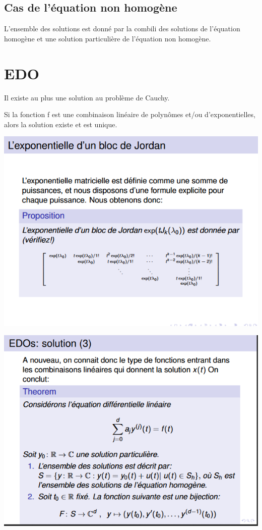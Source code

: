 \documentclass[a4paper]{book}
\begin{document}
\subsection{Cas de l'équation non homogène}
L'ensemble des solutions est donné par la combili des solutions de l'équation homogène et une solution particulière de l'équation non homogène.
\section{EDO}
\begin{framed}
    Il existe au plus une solution au problème de Cauchy.
\end{framed}
\begin{framed}
    Si la fonction f est une combinaison linéaire de polynômes et/ou d'exponentielles, alors la solution existe et est unique.
\end{framed}
\begin{center}
    \includegraphics[width=.7\linewidth]{expo.png}
\end{center}
\begin{center}
    \includegraphics[width=.7\linewidth]{edo.png}
\end{center}
\end{document}
